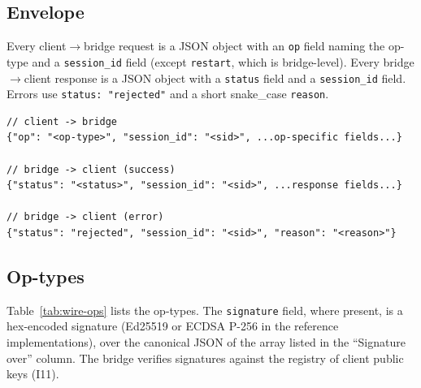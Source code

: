 \subsection{Envelope}

Every client$\to$bridge request is a JSON object with an \texttt{op}
field naming the op-type and a \texttt{session\_id} field (except
\texttt{restart}, which is bridge-level). Every bridge$\to$client
response is a JSON object with a \texttt{status} field and a
\texttt{session\_id} field. Errors use
\texttt{status: "rejected"} and a short snake\_case \texttt{reason}.

\begin{lstlisting}
// client -> bridge
{"op": "<op-type>", "session_id": "<sid>", ...op-specific fields...}

// bridge -> client (success)
{"status": "<status>", "session_id": "<sid>", ...response fields...}

// bridge -> client (error)
{"status": "rejected", "session_id": "<sid>", "reason": "<reason>"}
\end{lstlisting}

\subsection{Op-types}

Table~\ref{tab:wire-ops} lists the op-types. The
\texttt{signature} field, where present, is a hex-encoded signature (Ed25519 or ECDSA P-256 in the
reference implementations), over the canonical JSON of the array listed in the
``Signature over'' column. The bridge verifies signatures against
the registry of client public keys (I11).

